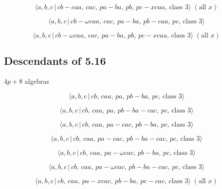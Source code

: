 \documentclass[10pt]{article}
\begin{document}
\begin{equation}
\langle a,b,c\,|\,cb-caa,\,cac,\,pa-ba,\,pb,\,pc-xcaa,\,\text{class }%
3\rangle\;(\text{all }x)  \tag{6.278}
\end{equation}

\begin{equation}
\langle a,b,c\,|\,cb-\omega caa,\,cac,\,pa-ba,\,pb-caa,\,pc,\,\text{class }%
3\rangle  \tag{6.279}
\end{equation}

\begin{equation}
\langle a,b,c\,|\,cb-\omega caa,\,cac,\,pa-ba,\,pb,\,pc-xcaa,\,\text{class }%
3\rangle\;(\text{all }x)  \tag{6.280}
\end{equation}

\subsection{Descendants of 5.16}

$4p+8$ algebras

\begin{equation}
\langle a,b,c\,|\,cb,\,caa,\,pa,\,pb-ba,\,pc,\,\text{class }3\rangle 
\tag{6.281}
\end{equation}

\begin{equation}
\langle a,b,c\,|\,cb,\,caa,\,pa,\,pb-ba-cac,\,pc,\,\text{class }3\rangle 
\tag{6.282}
\end{equation}

\begin{equation}
\langle a,b,c\,|\,cb,\,caa,\,pa-cac,\,pb-ba,\,pc,\,\text{class }3\rangle 
\tag{6.283}
\end{equation}

\begin{equation}
\langle a,b,c\,|\,cb,\,caa,\,pa-cac,\,pb-ba-cac,\,pc,\,\text{class }3\rangle
\tag{6.284}
\end{equation}

\begin{equation}
\langle a,b,c\,|\,cb,\,caa,\,pa-\omega cac,\,pb-ba,\,pc,\,\text{class }%
3\rangle  \tag{6.285}
\end{equation}

\begin{equation}
\langle a,b,c\,|\,cb,\,caa,\,pa-\omega cac,\,pb-ba-cac,\,pc,\,\text{class }%
3\rangle  \tag{6.286}
\end{equation}

\begin{equation}
\langle a,b,c\,|\,cb,\,caa,\,pa-xcac,\,pb-ba,\,pc-cac,\,\text{class }%
3\rangle\;(\text{all }x)  \tag{6.287}
\end{equation}
\end{document}
